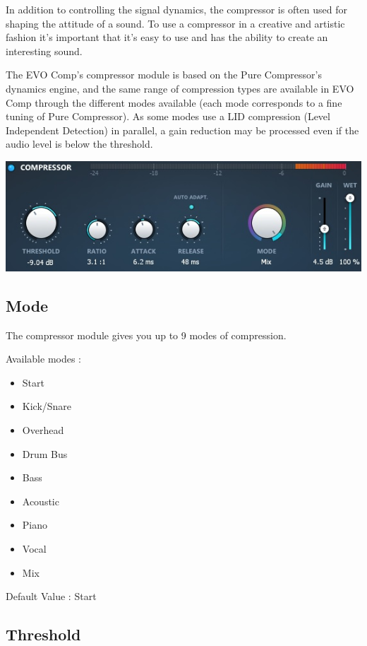 \documentclass[
  letterpaper,
  DIV=11,
  numbers=noendperiod]{scrreport}
\providecommand{\tightlist}{%
  \setlength{\itemsep}{0pt}\setlength{\parskip}{0pt}}\usepackage{longtable,booktabs,array}
\begin{document}
In addition to controlling the signal dynamics, the compressor is often
used for shaping the attitude of a sound. To use a compressor in a
creative and artistic fashion it's important that it's easy to use and
has the ability to create an interesting sound.

The EVO Comp's compressor module is based on the Pure Compressor's
dynamics engine, and the same range of compression types are available
in EVO Comp through the different modes available (each mode corresponds
to a fine tuning of Pure Compressor). As some modes use a LID
compression (Level Independent Detection) in parallel, a gain reduction
may be processed even if the audio level is below the threshold.

\includegraphics{./include/ManualEvoChannel-010.jpg}

\hypertarget{mode}{%
\subsection{Mode}\label{mode}}

The compressor module gives you up to 9 modes of compression.

Available modes :

\begin{itemize}
\tightlist
\item
  Start
\item
  Kick/Snare
\item
  Overhead
\item
  Drum Bus
\item
  Bass
\item
  Acoustic
\item
  Piano
\item
  Vocal
\item
  Mix
\end{itemize}

Default Value : Start

\hypertarget{threshold}{%
\subsection{Threshold}\label{threshold}}
\end{document}
